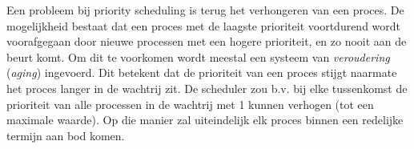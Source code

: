Een probleem bij priority scheduling is terug het verhongeren
van een proces. De mogelijkheid bestaat dat een proces met de
laagste prioriteit voortdurend wordt voorafgegaan door nieuwe
processen met een hogere prioriteit, en zo nooit aan de beurt komt. Om dit te
voorkomen wordt meestal een systeem van \emph{veroudering} (\emph{aging})
ingevoerd. Dit betekent dat de prioriteit van een proces stijgt naarmate het
proces langer in de wachtrij zit. De scheduler zou b.v. bij elke tussenkomst de
prioriteit van alle processen in de wachtrij met 1 kunnen verhogen (tot een
maximale waarde). Op die manier zal uiteindelijk elk proces binnen een redelijke
termijn aan bod komen.
